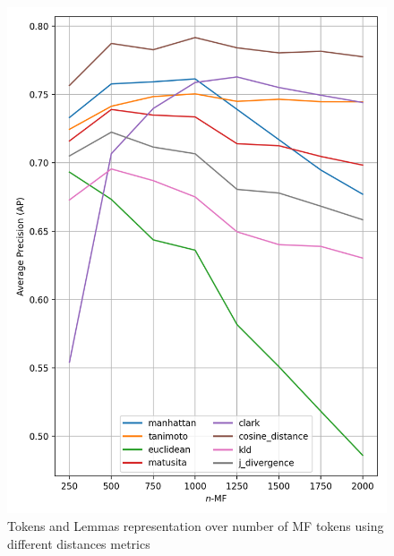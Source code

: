 \begin{figure}
  \centering
  \caption{Tokens and Lemmas representation over number of MF tokens using different distances metrics}
  \label{fig:tokens_lemmas}

  \label{fig:tokens}
  \includegraphics[width=0.9\linewidth]{img/mf_tokens.png}

  \vspace{0.5cm}


\end{figure}
